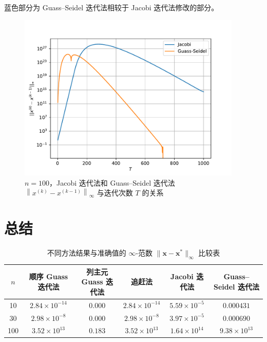 \documentclass{sjtuarticle}
\begin{document}
蓝色部分为 Guass--Seidel 迭代法相较于 Jacobi 迭代法修改的部分。

\begin{figure}[h]
    \centering
    \includegraphics[height=8cm]{pic/iter.pdf}
    \caption{$n=100$，Jacobi 迭代法和 Guass--Seidel 迭代法 $\left\lVert x^{(k)}-x^{(k-1)}\right\rVert_\infty$ 与迭代次数 $T$ 的关系}
    \label{fig:iter}
\end{figure}

\section{总结}

\begin{table}[H]
    \centering
    \caption{不同方法结果与准确值的 $\infty$-范数 $\lVert \bm{x}-\bm{x}^* \rVert_\infty$ 比较表}
    \label{tab:res}
    \begin{tabular}{cccccc}
        \toprule
        $n$ & 顺序 Guass 迭代法 & 列主元 Guass 迭代法 & 追赶法 & Jacobi 迭代法 & Guass--Seidel 迭代法 \\
        \midrule
        10  & $2.84\times 10^{-14}$ & $0.000$       & $2.84\times 10^{-14}$ & $5.59\times 10^{-5}$ & $0.000431$           \\
        30  & $2.98\times 10^{-8}$  & $0.000$       & $2.98\times 10^{-8}$  & $3.97\times 10^{-5}$ & $0.000690$           \\
        100 & $3.52\times 10^{13}$  & $0.183$ & $3.52\times 10^{13}$  & $1.64\times 10^{14}$ & $9.38\times 10^{13}$ \\
        \bottomrule
    \end{tabular}
\end{table}
\end{document}
